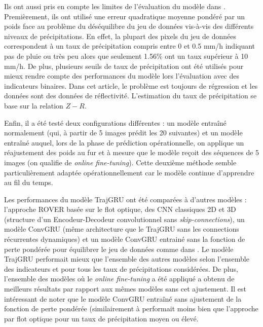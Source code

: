 \documentclass[12pt,a4paper,french]{article}
\begin{document}
Ils ont aussi pris en compte les limites de l'évaluation du modèle dans \cite{shi2015convolutional}. Premièrement, ils ont utilisé une erreur quadratique moyenne pondéré par un poids face au problème du déséquilibre du jeu de données vis-à-vis des différents niveaux de précipitations. En effet, la plupart des pixels du jeu de données correspondent à un taux de précipitation compris entre 0 et 0.5 mm/h indiquant pas de pluie ou très peu alors que seulement 1.56\% ont un taux supérieur à 10 mm/h. De plus, plusieurs seuils de taux de précipitation ont été utilisés pour mieux rendre compte des performances du modèle lors l'évaluation avec des indicateurs binaires. Dans cet article, le problème est toujours de régression et les données sont des données de réflectivité. L'estimation du taux de précipitation se base sur la relation $ Z - R $.

Enfin, il a été testé deux configurations différentes : un modèle entraîné normalement (qui, à partir de 5 images prédit les 20 suivantes) et un modèle entraîné auquel, lors de la phase de prédiction opérationnelle, on applique un réajustement des poids au fur et à mesure que le modèle reçoit des séquences de 5 images (on qualifie de \textit{online fine-tuning}). Cette deuxième méthode semble particulièrement adaptée opérationnellement car le modèle continue d'apprendre au fil du temps. \newline

Les performances du modèle TrajGRU ont été comparées à d'autres modèles : l'approche ROVER basée sur le flot optique, des CNN classiques 2D et 3D (structure d'un Encodeur-Decodeur convolutionnel sans \textit{skip-connections}), un modèle ConvGRU (même architecture que le TrajGRU sans les connections récurrentes dynamiques) et un modèle ConvGRU entrainé sans la fonction de perte pondérée pour équilibrer le jeu de données comme dans \cite{shi2015convolutional}. Le modèle TrajGRU performait mieux que l'ensemble des autres modèles selon l'ensemble des indicateurs et pour tous les taux de précipitations considérées. De plus, l'ensemble des modèles où le \textit{online fine-tuning} a été appliqué a obtenu de meilleurs résultats par rapport aux mêmes modèles sans cet ajustement. Il est intéressant de noter que le modèle ConvGRU entraîné sans ajustement de la fonction de perte pondérée (similairement à \cite{shi2015convolutional} performait moins bien que l'approche par flot optique pour un taux de précipitation moyen ou élevé. \newline
\end{document}
